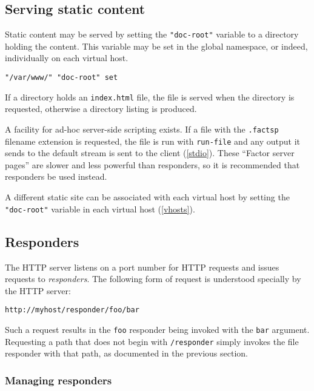 \documentclass{book}
\begin{document}
\subsection{Serving static content}

Static content may be served by setting the \verb|"doc-root"| variable to a directory holding the content. This variable may be set in the global namespace, or indeed, individually on each virtual host.
\begin{verbatim}
"/var/www/" "doc-root" set
\end{verbatim}

If a directory holds an \verb|index.html| file, the file is served when the directory is requested, otherwise a directory listing is produced.

A facility for ad-hoc server-side scripting exists. If a file with the \verb|.factsp| filename extension is requested, the file is run with \verb|run-file| and any output it sends to the default stream is sent to the client (\ref{stdio}). These ``Factor server pages'' are slower and less powerful than responders, so it is recommended that responders be used instead.

A different static site can be associated with each virtual host by setting the \verb|"doc-root"| variable in each virtual host (\ref{vhosts}).

\subsection{Responders}


The HTTP server listens on a port number for HTTP requests and issues requests to \emph{responders}. The following form of request is understood specially by the HTTP server:
\begin{verbatim}
http://myhost/responder/foo/bar
\end{verbatim}
Such a request results in the \verb|foo| responder being invoked with the \verb|bar| argument. Requesting a path that does not begin with \verb|/responder| simply invokes the file responder with that path, as documented in the previous section.

\subsubsection{Managing responders}
\end{document}
